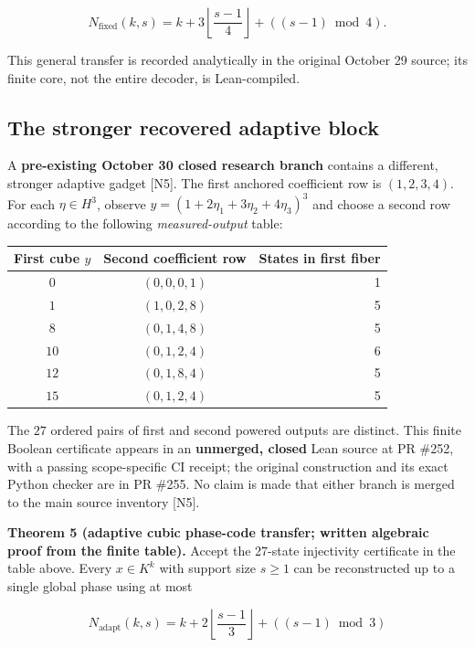 \documentclass[
  10pt,
]{article}
\begin{document}
\[
N_{\mathrm{fixed}}(k,s)=k+3\left\lfloor\frac{s-1}{4}\right\rfloor+((s-1)\bmod4). \tag{21}
\]

This general transfer is recorded analytically in the original October
29 source; its finite core, not the entire decoder, is Lean-compiled.

\subsection{The stronger recovered adaptive
block}\label{the-stronger-recovered-adaptive-block}

A \textbf{pre-existing October 30 closed research branch} contains a
different, stronger adaptive gadget {[}N5{]}. The first anchored
coefficient row is \((1,2,3,4)\). For each \(\eta\in H^3\), observe
\(y=(1+2\eta_1+3\eta_2+4\eta_3)^3\) and choose a second row according to
the following \emph{measured-output} table:

\begin{longtable}[]{@{}ccr@{}}
\toprule\noalign{}
First cube \(y\) & Second coefficient row & States in first fiber \\
\midrule\noalign{}
\endhead
\bottomrule\noalign{}
\endlastfoot
\(0\) & \((0,0,0,1)\) & 1 \\
\(1\) & \((1,0,2,8)\) & 5 \\
\(8\) & \((0,1,4,8)\) & 5 \\
\(10\) & \((0,1,2,4)\) & 6 \\
\(12\) & \((0,1,8,4)\) & 5 \\
\(15\) & \((0,1,2,4)\) & 5 \\
\end{longtable}

The \(27\) ordered pairs of first and second powered outputs are
distinct. This finite Boolean certificate appears in an
\textbf{unmerged, closed} Lean source at PR \#252, with a passing
scope-specific CI receipt; the original construction and its exact
Python checker are in PR \#255. No claim is made that either branch is
merged to the main source inventory {[}N5{]}.

\textbf{Theorem 5 (adaptive cubic phase-code transfer; written algebraic
proof from the finite table).} Accept the 27-state injectivity
certificate in the table above. Every \(x\in K^k\) with support size
\(s\ge1\) can be reconstructed up to a single global phase using at most

\[
\boxed{N_{\mathrm{adapt}}(k,s)=
k+2\left\lfloor\frac{s-1}{3}\right\rfloor+((s-1)\bmod3)} \tag{22}
\]
\end{document}
